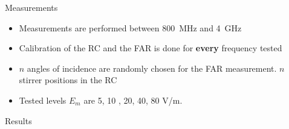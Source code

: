 \documentclass[final,hyperref={pdfpagelabels=false}]{beamer}
\begin{document}
\begin{frame}{}
\begin{columns}[t]
\begin{column}{0.32\linewidth}
\vspace{-1.0cm}
 \begin{block}{Measurements}
       \large{ \begin{itemize}
	\item Measurements are performed between 800~MHz and 4~GHz
	\item Calibration of the RC and the FAR is done for \textbf{every} frequency tested
	\item $n$ angles of incidence are randomly chosen for the FAR measurement. $n$ stirrer positions in the RC
	\item Tested levels $E_m$ are 5, 10 , 20, 40, 80 V/m. 
	\end{itemize}}
      \end{block}
      \begin{block}{Results}
\vspace{-0.5cm}
\begin{figure}
     \centering
     \\

\end{figure}
\end{block}
\end{column}
\end{columns}
\end{frame}
\end{document}
